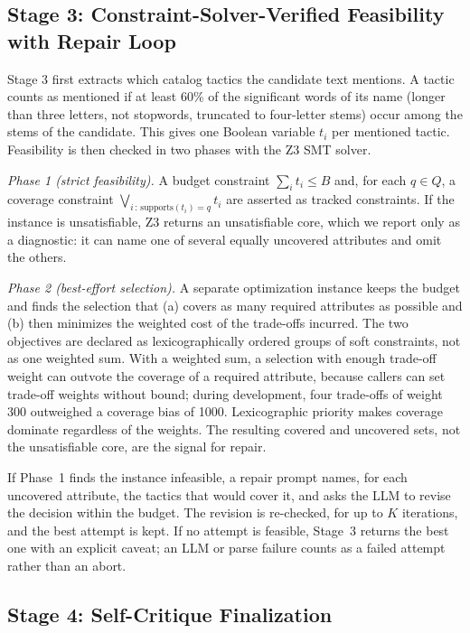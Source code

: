 \documentclass[preprint,12pt,authoryear]{elsarticle}
\renewcommand{\_}{\textunderscore\allowbreak{}}
\begin{document}
\subsection{Stage 3: Constraint-Solver-Verified Feasibility with Repair Loop}
\label{sec:method-stage3}

Stage 3 first extracts which catalog tactics the candidate text mentions. A tactic counts as mentioned if at least 60\% of the significant words of its name (longer than three letters, not stopwords, truncated to four-letter stems) occur among the stems of the candidate. This gives one Boolean variable $t_i$ per mentioned tactic. Feasibility is then checked in two phases with the Z3 SMT solver.

\emph{Phase 1 (strict feasibility).} A budget constraint $\sum_i t_i \leq B$ and, for each $q \in Q$, a coverage constraint $\bigvee_{i \,:\, \mathrm{supports}(t_i) = q} t_i$ are asserted as tracked constraints. If the instance is unsatisfiable, Z3 returns an unsatisfiable core, which we report only as a diagnostic: it can name one of several equally uncovered attributes and omit the others.

\emph{Phase 2 (best-effort selection).} A separate optimization instance keeps the budget and finds the selection that (a) covers as many required attributes as possible and (b) then minimizes the weighted cost of the trade-offs incurred. The two objectives are declared as lexicographically ordered groups of soft constraints, not as one weighted sum. With a weighted sum, a selection with enough trade-off weight can outvote the coverage of a required attribute, because callers can set trade-off weights without bound; during development, four trade-offs of weight 300 outweighed a coverage bias of 1000. Lexicographic priority makes coverage dominate regardless of the weights. The resulting covered and uncovered sets, not the unsatisfiable core, are the signal for repair.

If Phase~1 finds the instance infeasible, a repair prompt names, for each uncovered attribute, the tactics that would cover it, and asks the LLM to revise the decision within the budget. The revision is re-checked, for up to $K$ iterations, and the best attempt is kept. If no attempt is feasible, Stage~3 returns the best one with an explicit caveat; an LLM or parse failure counts as a failed attempt rather than an abort.

\subsection{Stage 4: Self-Critique Finalization}
\label{sec:method-stage4}
\end{document}
